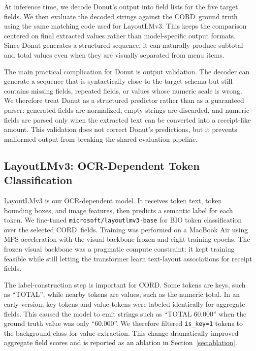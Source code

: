 \documentclass[9pt,twocolumn,twoside]{extarticle}
\newcommand{\cord}{\textsc{CORD}}
\begin{document}
At inference time, we decode Donut's output into field lists for the five target fields. We then evaluate the decoded strings against the \cord\ ground truth using the same matching code used for LayoutLMv3. This keeps the comparison centered on final extracted values rather than model-specific output formats. Since Donut generates a structured sequence, it can naturally produce subtotal and total values even when they are visually separated from menu items.

The main practical complication for Donut is output validation. The decoder can generate a sequence that is syntactically close to the target schema but still contains missing fields, repeated fields, or values whose numeric scale is wrong. We therefore treat Donut as a structured predictor rather than as a guaranteed parser: generated fields are normalized, empty strings are discarded, and numeric fields are parsed only when the extracted text can be converted into a receipt-like amount. This validation does not correct Donut's predictions, but it prevents malformed output from breaking the shared evaluation pipeline.

\subsection{LayoutLMv3: OCR-Dependent Token Classification}
\label{sec:layoutlm}

LayoutLMv3 is our OCR-dependent model. It receives token text, token bounding boxes, and image features, then predicts a semantic label for each token. We fine-tuned \texttt{microsoft/layoutlmv3-base} for BIO token classification over the selected \cord\ fields. Training was performed on a MacBook Air using MPS acceleration with the visual backbone frozen and eight training epochs. The frozen visual backbone was a pragmatic compute constraint: it kept training feasible while still letting the transformer learn text-layout associations for receipt fields.

The label-construction step is important for \cord. Some tokens are keys, such as ``TOTAL'', while nearby tokens are values, such as the numeric total. In an early version, key tokens and value tokens were labeled identically for aggregate fields. This caused the model to emit strings such as ``TOTAL 60.000'' when the ground truth value was only ``60.000''. We therefore filtered \texttt{is\_key=1} tokens to the background class for value extraction. This change dramatically improved aggregate field scores and is reported as an ablation in Section~\ref{sec:ablation}.
\end{document}
